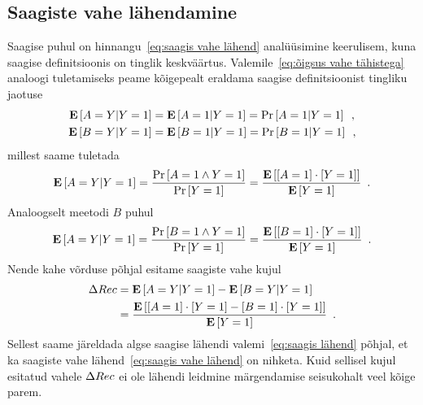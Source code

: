 \subsection{Saagiste vahe lähendamine}
Saagise puhul on hinnangu~\eqref{eq:saagis vahe lähend} analüüsimine keerulisem, kuna saagise definitsioonis on tinglik keskväärtus. Valemile~\eqref{eq:õigsus vahe tähistega} analoogi tuletamiseks peame kõigepealt eraldama saagise definitsioonist tingliku jaotuse
\begin{align*}
    \operatorname*{\mathbf{E}}\left[A = Y | Y = 1\right] &= \operatorname*{\mathbf{E}}\left[A = 1 | Y = 1\right] = \Pr\left[A = 1 | Y = 1\right] \enspace, \\
    \operatorname*{\mathbf{E}}\left[B = Y | Y = 1\right] &= \operatorname*{\mathbf{E}}\left[B = 1 | Y = 1\right] = \Pr\left[B = 1 | Y = 1\right] \enspace,
\end{align*}
millest saame tuletada
\begin{equation*}
    \operatorname*{\mathbf{E}}\left[A = Y | Y = 1\right] =\frac{\Pr\left[A = 1 \land Y = 1\right]}{\Pr\left[Y = 1\right]} = \frac{\operatorname*{\mathbf{E}}\left[[A = 1] \cdot [Y = 1]\right]}{\operatorname*{\mathbf{E}}\left[Y = 1\right]} \enspace.
\end{equation*}
Analoogselt meetodi $B$ puhul
\begin{equation*}
    \operatorname*{\mathbf{E}}\left[A = Y | Y = 1\right] = \frac{\Pr\left[B = 1 \land Y = 1\right]}{\Pr\left[Y = 1\right]} = \frac{\operatorname*{\mathbf{E}}\left[[B = 1] \cdot [Y = 1]\right]}{\operatorname*{\mathbf{E}}\left[Y = 1\right]} \enspace.
\end{equation*}
Nende kahe võrduse põhjal esitame saagiste vahe kujul
\begin{align*}
    \Delta Rec &= \operatorname*{\mathbf{E}}\left[A = Y | Y = 1\right] - \operatorname*{\mathbf{E}}\left[B = Y | Y = 1\right] \\
    &= \frac{\operatorname*{\mathbf{E}}\left[[A = 1] \cdot [Y = 1] - [B = 1] \cdot [Y = 1]\right]}{\operatorname*{\mathbf{E}}\left[Y = 1\right]} \enspace.
\end{align*}
Sellest saame järeldada algse saagise lähendi valemi~\eqref{eq:saagis lähend} põhjal, et ka saagiste vahe lähend~\eqref{eq:saagis vahe lähend} on nihketa. Kuid sellisel kujul esitatud vahele $\Delta Rec$ ei ole lähendi leidmine märgendamise seisukohalt veel kõige parem.

